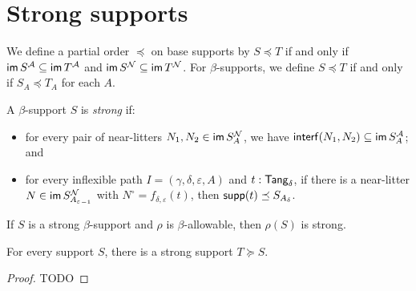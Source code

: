 \section{Strong supports}
\begin{definition}
  \label{def:StrSupport.Occurs}
  We define a partial order \( \preceq \) on base supports by \( S \preceq T \) if and only if \( \operatorname{\mathsf{im}} S^{\mathcal A} \subseteq \operatorname{\mathsf{im}} T^{\mathcal A} \) and \( \operatorname{\mathsf{im}} S^{\mathcal N} \subseteq \operatorname{\mathsf{im}} T^{\mathcal N} \).
  For \( \beta \)-supports, we define \( S \preceq T \) if and only if \( S_A \preceq T_A \) for each \( A \).
\end{definition}
\begin{definition}
  \label{def:Strong}
  A \( \beta \)-support \( S \) is \emph{strong} if:
  \begin{itemize}
    \item for every pair of near-litters \( N_1, N_2 \in \operatorname{\mathsf{im}} S_A^{\mathcal N} \), we have \( \operatorname{\mathsf{interf}}(N_1, N_2) \subseteq \operatorname{\mathsf{im}} S_A^{\mathcal A} \); and
    \item for every inflexible path \( I = (\gamma,\delta,\varepsilon,A) \) and \( t : \mathsf{Tang}_\delta \), if there is a near-litter \( N \in \operatorname{\mathsf{im}} S_{{A_\varepsilon}_{-1}}^{\mathcal N} \) with \( N^\circ = f_{\delta,\varepsilon}(t) \), then \( \operatorname{\mathsf{supp}}(t) \preceq S_{A_\delta} \).
  \end{itemize}
\end{definition}
\begin{proposition}
  \label{prop:Strong.smul}
  If \( S \) is a strong \( \beta \)-support and \( \rho \) is \( \beta \)-allowable, then \( \rho(S) \) is strong.
\end{proposition}
\begin{proposition}
  \label{prop:exists_strong}
  For every support \( S \), there is a strong support \( T \succeq S \).
\end{proposition}
\begin{proof}
  TODO
\end{proof}

